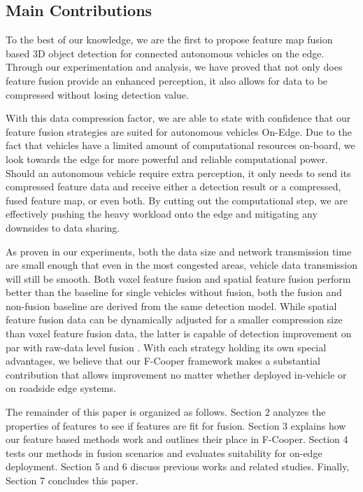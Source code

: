 \documentclass[sigconf]{acmart}
\begin{document}
\subsection{Main Contributions}
To the best of our knowledge, we are the first to propose feature map fusion based 3D object detection for connected autonomous vehicles on the edge. Through our experimentation and analysis, we have proved that not only does feature fusion provide an enhanced perception, it also allows for data to be compressed without losing detection value. 

With this data compression factor, we are able to state with confidence that our feature fusion strategies are suited for autonomous vehicles On-Edge. Due to the fact that vehicles have a limited amount of computational resources on-board, we look towards the edge for more powerful and reliable computational power. Should an autonomous vehicle require extra perception, it only needs to send its compressed feature data and receive either a detection result or a compressed, fused feature map, or even both. By cutting out the computational step, we are effectively pushing the heavy workload onto the edge and mitigating any downsides to data sharing. 

As proven in our experiments, both the data size and network transmission time are small enough that even in the most congested areas, vehicle data transmission will still be smooth. Both voxel feature fusion and spatial feature fusion perform better than the baseline for single vehicles without fusion, both the fusion and non-fusion baseline are derived from the same detection model. While spatial feature fusion data can be dynamically adjusted for a smaller compression size than voxel feature fusion data, the latter is capable of detection improvement on par with raw-data level fusion \cite{qi2019cooper}. With each strategy holding its own special advantages, we believe that our F-Cooper framework makes a substantial contribution that allows improvement no matter whether deployed in-vehicle or on roadside edge systems.


The remainder of this paper is organized as follows. Section 2 analyzes the properties of features to see if features are fit for fusion. Section 3 explains how our feature based methods work and outlines their place in F-Cooper. Section 4 tests our methods in fusion scenarios and evaluates suitability for on-edge deployment. Section 5 and 6 discuss previous works and related studies. Finally, Section 7 concludes this paper. 
\end{document}
